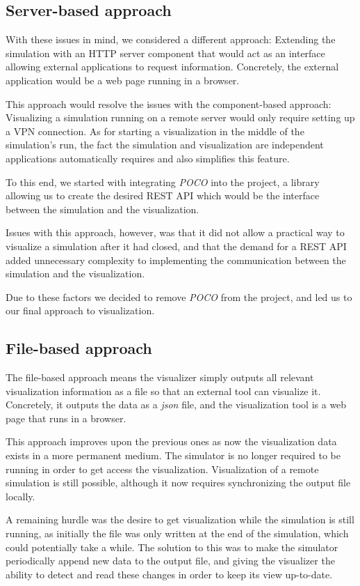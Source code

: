\documentclass[a4paper,12pt]{article}
\begin{document}
\subsection{Server-based approach}
With these issues in mind, we considered a different approach: Extending the simulation with an HTTP server component that would act as an interface allowing external applications to request information. Concretely, the external application would be a web page running in a browser.

This approach would resolve the issues with the component-based approach: Visualizing a simulation running on a remote server would only require setting up a VPN connection. As for starting a visualization in the middle of the simulation's run, the fact the simulation and visualization are independent applications automatically requires and also simplifies this feature.

To this end, we started with integrating \textit{POCO} into the project, a library allowing us to create the desired REST API which would be the interface between the simulation and the visualization.

Issues with this approach, however, was that it did not allow a practical way to visualize a simulation after it had closed, and that the demand for a REST API added unnecessary complexity to implementing the communication between the simulation and the visualization.

Due to these factors we decided to remove \textit{POCO} from the project, and led us to our final approach to visualization.

\subsection{File-based approach}
The file-based approach means the visualizer simply outputs all relevant visualization information as a file so that an external tool can visualize it. Concretely, it outputs the data as a \textit{json} file, and the visualization tool is a web page that runs in a browser.

This approach improves upon the previous ones as now the visualization data exists in a more permanent medium. The simulator is no longer required to be running in order to get access the visualization. Visualization of a remote simulation is still possible, although it now requires synchronizing the output file locally.

A remaining hurdle was the desire to get visualization while the simulation is still running, as initially the file was only written at the end of the simulation, which could potentially take a while. The solution to this was to make the simulator periodically append new data to the output file, and giving the visualizer the ability to detect and read these changes in order to keep its view up-to-date.
\end{document}
